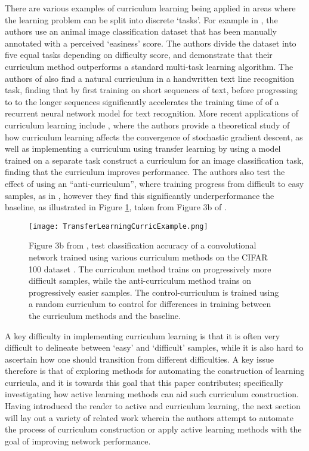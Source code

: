 There are various examples of curriculum learning being applied in areas where the learning problem can be split into discrete `tasks'. For example in \cite{pentina2015curriculum}, the authors use an animal image classification dataset that has been manually annotated with a perceived `easiness' score. The authors divide the dataset into five equal tasks depending on difficulty score, and demonstrate that their curriculum method outperforms a standard multi-task learning algorithm. The authors of \cite{louradour2014curriculum} also find a natural curriculum in a handwritten text line recognition task, finding that by first training on short sequences of text, before progressing to to the longer sequences significantly accelerates the training time of of a recurrent neural network \cite{mikolov2010recurrent} model for text recognition. More recent applications of curriculum learning include \cite{weinshall2018curriculum}, where the authors provide a theoretical study of how curriculum learning affects the convergence of stochastic gradient descent, as well as implementing a curriculum using transfer learning by using a model trained on a separate task construct a curriculum for an image classification task, finding that the curriculum improves performance. The authors also test the effect of using an ``anti-curriculum'', where training progress from difficult to easy samples, as in \cite{avramova2015curriculum}, however they find this significantly underperformance the baseline, as illustrated in Figure \ref{TransferExample}, taken from Figure 3b of \cite{weinshall2018curriculum}. 

\begin{figure}[h!]
\centering
\texttt{[image: TransferLearningCurricExample.png]}
\caption{Figure 3b from  \cite{weinshall2018curriculum}, test classification accuracy of a convolutional network trained using various curriculum methods on the CIFAR 100 dataset \cite{krizhevsky2009learning}. The curriculum method trains on progressively more difficult samples, while the anti-curriculum method trains on progressively easier samples. The control-curriculum is trained using a random curriculum to control for differences in training between the curriculum methods and the baseline.}
\label{TransferExample}
\end{figure}

A key difficulty in implementing curriculum learning is that it is often very difficult to delineate between `easy' and `difficult' samples, while it is also hard to ascertain how one should transition from different difficulties. A key issue therefore is that of exploring methods for  automating the construction of learning curricula, and it is towards this goal that this paper contributes; specifically investigating how active learning methods can aid such curriculum construction. Having introduced the reader to active and curriculum learning, the next section will lay out a variety of related work wherein the authors attempt to automate the process of curriculum construction or apply active learning methods with the goal of improving network performance. 


